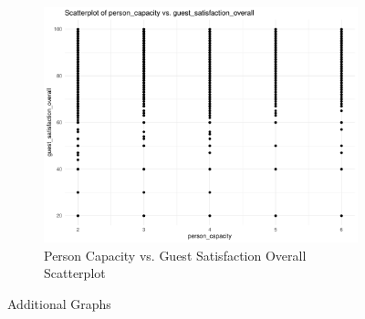 \documentclass[12pt, letterpaper]{article}
\begin{document}
\begin{figure}[H]
  \begin{subfigure}{0.45\textwidth}
    \includegraphics[width=\linewidth]{person_capacity_guest_satisfaction_overall__scatterplot.pdf}
    \caption{Person Capacity vs. Guest Satisfaction Overall Scatterplot}
    \label{fig:person_capacity_guest_satisfaction_overall__scatterplot}
  \end{subfigure}

  \caption{Additional Graphs}
  \label{fig:additional_graphs_3}
\end{figure}
\end{document}
